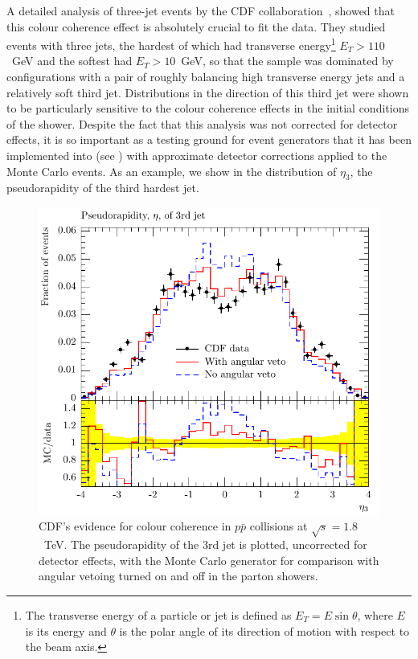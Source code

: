A detailed analysis of three-jet events by the CDF
collaboration~\cite{Abe:1994nj}, showed that this colour coherence
effect is absolutely crucial to fit the data. They studied events with
three jets, the hardest of which had transverse energy\footnote{The transverse
  energy of a particle or jet is defined as $E_T=E\sin\theta$, where
  $E$ is its energy and $\theta$ is the polar angle of its direction of
  motion with respect to the beam axis.} $E_T>110$~GeV and the softest had
$E_T>10$~GeV, so that the sample was dominated by configurations with a
pair of roughly balancing high transverse energy jets and a relatively
soft third jet.  Distributions in the direction of this third jet were shown
to be particularly sensitive to the colour coherence effects in the
initial conditions of the shower.  Despite the fact that this analysis
was not corrected for detector effects, it is so important as a testing
ground for event generators that it has been implemented into \rivet
(see ) with
approximate detector corrections applied to the Monte Carlo events.  As an
example, we show in  the distribution of
$\eta_3$, the pseudorapidity of the third hardest jet.
\begin{figure}[tbp]
  \centering
  \includegraphics[scale=0.7]{mc-plots/CDF_1994_S2952106-inline/CDF_1994_S2952106_d03-x01-y01}
  \caption{CDF's evidence for colour coherence in $p\bar{p}$ collisions at
    $\sqrt{s} = 1.8$~TeV. The pseudorapidity of the 3rd jet is plotted,
    uncorrected for detector effects, with the \pythiasix Monte Carlo generator
    for comparison with angular vetoing turned on and off in the parton
    showers.}
  \label{fig:CDFcoherence}
\end{figure}
